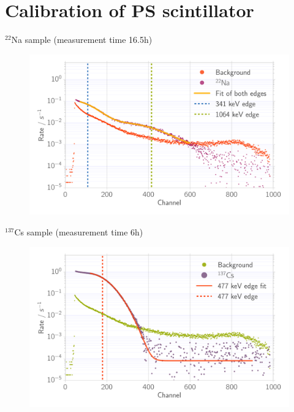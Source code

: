 \documentclass[xcolor=x11names,compress]{beamer}
\renewcommand{\(}{\begin{columns}}
\renewcommand{\)}{\end{columns}}
\newcommand{\<}[1]{\begin{column}{#1}}
\renewcommand{\>}{\end{column}}
\begin{document}
\section{Calibration of PS scintillator}
\begin{frame}[t]{$^{22}$Na sample (measurement time 16.5h) }
\begin{figure}[htpb]
    \centering
    \includegraphics[width=1.0\linewidth]{../analysis/figures/calib_ps_na}
\label{fig:calib_ps_na}
\end{figure}
\end{frame}

\begin{frame}[t]{$^{137}$Cs sample (measurement time 6h) }
\begin{figure}[htpb]
\centering
\includegraphics[width=1.0\linewidth]{../analysis/figures/calib_ps_cs}
\label{fig:calib_ps_cs}
\end{figure}
\end{frame}
\end{document}
